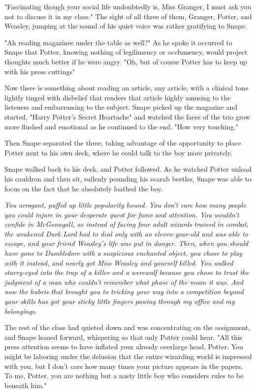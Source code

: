 "Fascinating though your social life undoubtedly is, Miss Granger, I must ask you not to discuss it in my class." The sight of all three of them, Granger, Potter, and Weasley, jumping at the sound of his quiet voice was rather gratifying to Snape.

"Ah{\el} reading magazines under the table as well?" As he spoke it occurred to Snape that Potter, knowing nothing of legilimency or occlumency, would project thoughts much better if he were angry. "Oh, but of course{\el} Potter has to keep up with his press cuttings{\el}"

Now there is something about reading an article, any article, with a clinical tone lightly tinged with disbelief that renders that article highly amusing to the listeners and embarrassing to the subject. Snape picked up the magazine and started, "Harry Potter's Secret Heartache{\el}" and watched the faces of the trio grow more flushed and emotional as he continued to the end. "How very touching."

Then Snape separated the three, taking advantage of the opportunity to place Potter next to his own desk, where he could talk to the boy more privately.

Snape walked back to his desk, and Potter followed. As he watched Potter unload his cauldron and then sit, sullenly pounding his scarab beetles, Snape was able to focus on the fact that he absolutely loathed the boy.

\emph{You arrogant, puffed up little popularity hound. You don't care how many people you could injure in your desperate quest for fame and attention. You wouldn't confide in McGonagall, so instead of facing four adult wizards trained in combat, the weakened Dark Lord had to deal only with an eleven-year-old and was able to escape, and your friend Weasley's life was put in danger. Then, when you should have gone to Dumbledore with a suspicious enchanted object, you chose to play with it instead, and nearly got Miss Weasley and yourself killed. You walked starry-eyed into the trap of a killer and a werewolf because you chose to trust the judgment of a man who couldn't remember what phase of the moon it was. And now the hubris that brought you to tricking your way into a competition beyond your skills has got your sticky little fingers pawing through my office and my belongings.}

The rest of the class had quieted down and was concentrating on the assignment, and Snape leaned forward, whispering so that only Potter could hear. "All this press attention seems to have inflated your already overlarge head, Potter. You might be laboring under the delusion that the entire wizarding world is impressed with you, but I don't care how many times your picture appears in the papers. To me, Potter, you are nothing but a nasty little boy who considers rules to be beneath him."

